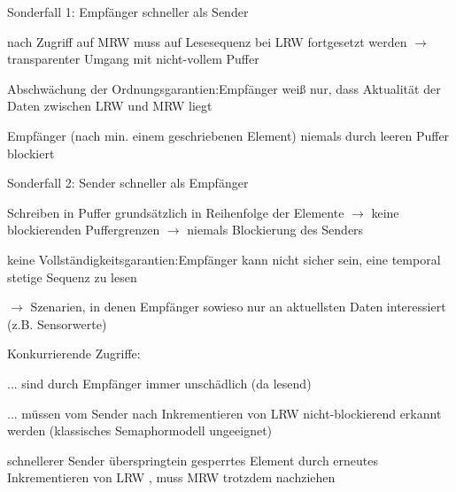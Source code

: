 \documentclass[a4paper]{article}
\begin{document}
\begin{multicols}{3}
    Sonderfall 1: Empfänger schneller als Sender

    \begin{itemize*}
        \item
        nach Zugriff auf MRW muss auf Lesesequenz bei LRW fortgesetzt werden
        $\rightarrow$ transparenter Umgang mit nicht-vollem
        Puffer
        \item
        Abschwächung der Ordnungsgarantien:Empfänger weiß nur, dass Aktualität
        der Daten zwischen LRW und MRW liegt
        \item
        Empfänger (nach min. einem geschriebenen Element) niemals durch leeren
        Puffer blockiert
        \item
    \end{itemize*}

    Sonderfall 2: Sender schneller als Empfänger

    \begin{itemize*}
        \item
        Schreiben in Puffer grundsätzlich in Reihenfolge der Elemente
        $\rightarrow$ keine blockierenden Puffergrenzen
        $\rightarrow$ niemals Blockierung des Senders
        \item
        keine Vollständigkeitsgarantien:Empfänger kann nicht sicher sein, eine
        temporal stetige Sequenz zu lesen
        \item
        $\rightarrow$ Szenarien, in denen Empfänger sowieso
        nur an aktuellsten Daten interessiert (z.B. Sensorwerte)
        \item
    \end{itemize*}

    Konkurrierende Zugriffe:

    \begin{itemize*}
        \item
        ... sind durch Empfänger immer unschädlich (da lesend)
        \item
        ... müssen vom Sender nach Inkrementieren von LRW nicht-blockierend
        erkannt werden (klassisches Semaphormodell ungeeignet)
        \item
        schnellerer Sender überspringtein gesperrtes Element durch erneutes
        Inkrementieren von LRW , muss MRW trotzdem nachziehen
        \item
    \end{itemize*}



\end{multicols}
\end{document}
